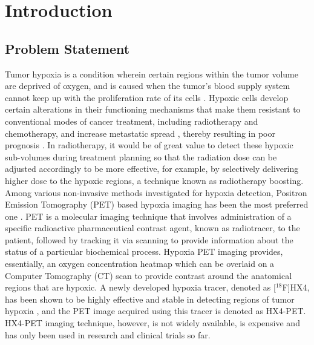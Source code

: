 \chapter{Introduction}
\label{Introduction}



\section{Problem Statement}
Tumor hypoxia is a condition wherein certain regions within the tumor volume are deprived of oxygen, and is caused when the tumor's blood supply system cannot keep up with the proliferation rate of its cells \cite{hockel2001tumor}. Hypoxic cells develop certain alterations in their functioning mechanisms that make them resistant to conventional modes of cancer treatment, including radiotherapy and chemotherapy, and increase metastatic spread \cite{muz2015role}, thereby resulting in poor prognosis \cite{vaupel2007hypoxia}. In radiotherapy, it would be of great value to detect these hypoxic sub-volumes during treatment planning so that the radiation dose can be adjusted accordingly to be more effective, for example, by selectively delivering higher dose to the hypoxic regions, a technique known as radiotherapy boosting. Among various non-invasive methods investigated for hypoxia detection, Positron Emission Tomography (PET) based hypoxia imaging has been the most preferred one \cite{fleming2015imaging}. PET is a molecular imaging technique that involves administration of a specific radioactive pharmaceutical contrast agent, known as radiotracer, to the patient, followed by tracking it via scanning to provide information about the status of a particular biochemical process. Hypoxia PET imaging provides, essentially, an oxygen concentration heatmap which can be overlaid on a Computer Tomography (CT) scan to provide contrast around the anatomical regions that are hypoxic. A newly developed hypoxia tracer, denoted as [$^{18}$F]HX4, has been shown to be highly effective and stable in detecting regions of tumor hypoxia \cite{sanduleanu2020hypoxia}, and the PET image acquired using this tracer is denoted as HX4-PET. HX4-PET imaging technique, however, is not widely available, is expensive and has only been used in research and clinical trials so far. 

